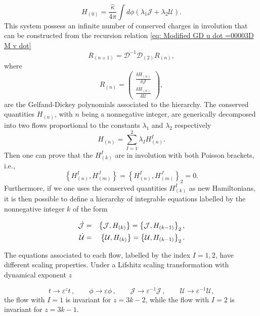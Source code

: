 \documentclass[letterpaper,11pt,oneside]{book}
\begin{document}
\[
H_{\left(0\right)}=\frac{\hat{\kappa}}{4\pi}\int d\phi\left(\lambda_{1}\mathcal{J}+\lambda_{2}\mathcal{U}\right).
\]
This system possess an infinite number of conserved charges in involution
that can be constructed from the recursion relation \eqref{eq: Modified GD u dot =00003D M v dot}
\begin{equation}
	R_{\left(n+1\right)}=\mathcal{D}^{-1}\mathcal{D}_{\left(2\right)}R_{\left(n\right)},\label{eq:rec}
\end{equation}
where
\begin{equation}
	R_{\left(n\right)}=\left(\begin{array}{c}
		\frac{\delta H_{\left(n\right)}}{\delta\mathcal{J}}\\
		\frac{\delta H_{\left(n\right)}}{\delta\mathcal{U}}
	\end{array}\right),\label{eq:GelfandDickey}
\end{equation}
are the Gelfand-Dickey polynomials associated to the hierarchy. The
conserved quantities $H_{\left(n\right)}$, with $n$ being a nonnegative
integer, are generically decomposed into two flows proportional to
the constants $\lambda_{1}$ and $\lambda_{2}$ respectively
\begin{equation}
	H_{\left(n\right)}=\sum_{I=1}^{2}\lambda_{I}H_{\left(n\right)}^{I}.\label{eq: decomp}
\end{equation}
Then one can prove that the $H_{\left(k\right)}^{I}$ are in involution
with both Poisson brackets, i.e.,
\[
\left\{ H_{\left(n\right)}^{I},H_{\left(m\right)}^{J}\right\} =\left\{ H_{\left(n\right)}^{I},H_{\left(m\right)}^{J}\right\} _{2}=0.
\]
Furthermore, if we one uses the conserved quantities $H_{\left(k\right)}^{I}$
as new Hamiltonians, it is then possible to define a hierarchy of
integrable equations labelled by the nonnegative integer $k$ of the
form

\begin{eqnarray}
	\dot{\mathcal{J}} & = & \left\{ \mathcal{J},H_{\left(k\right)}\right\} =\left\{ \mathcal{J},H_{\left(k-1\right)}\right\} _{2},\nonumber \\
	\dot{{\cal U}} & = & \left\{ {\cal U},H_{\left(k\right)}\right\} =\left\{ {\cal U},H_{\left(k-1\right)}\right\} _{2}.\label{eq:hierarchy}
\end{eqnarray}

The equations associated to each flow, labelled by the index $I=1,2$,
have different scaling properties. Under a Lifshitz scaling transformation
with dynamical exponent $z$

\[
t\rightarrow\varepsilon^{z}t\,,\quad\quad\phi\rightarrow\varepsilon\phi\,,\quad\quad\mathcal{J}\rightarrow\varepsilon^{-1}\mathcal{J}\,,\quad\quad\mathcal{U}\rightarrow\varepsilon^{-1}\mathcal{U},
\]
the flow with $I=1$ is invariant for $z=3k-2$, while the flow with
$I=2$ is invariant for $z=3k-1$.
\end{document}
